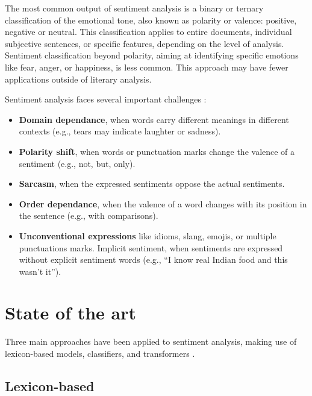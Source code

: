 \documentclass{article}
\begin{document}
The most common output of sentiment analysis is a binary or ternary classification of the emotional tone, also known as polarity or valence: positive, negative or neutral. This classification applies to entire documents, individual subjective sentences, or specific features, depending on the level of analysis. Sentiment classification beyond polarity, aiming at identifying specific emotions like fear, anger, or happiness, is less common. This approach may have fewer applications outside of literary analysis.

Sentiment analysis faces several important challenges \citep{kumar_comprehensive_2023}:
\begin{itemize}
    \item \textbf{Domain dependance}, when words carry different meanings in different contexts (e.g., tears may indicate laughter or sadness).
    \item \textbf{Polarity shift}, when words or punctuation marks change the valence of a sentiment (e.g., not, but, only).
    \item \textbf{Sarcasm}, when the expressed sentiments oppose the actual sentiments.
    \item \textbf{Order dependance}, when the valence of a word changes with its position in the sentence (e.g., with comparisons).
    \item \textbf{Unconventional expressions} like idioms, slang, emojis, or multiple punctuations marks.
Implicit sentiment, when sentiments are expressed without explicit sentiment words (e.g., \enquote{I know real Indian food and this wasn’t it}).
\end{itemize}


\section{State of the art}

Three main approaches have been applied to sentiment analysis, making use of lexicon-based models, classifiers, and transformers \citep{hartmann_more_2023}.

\subsection{Lexicon-based}
\end{document}
